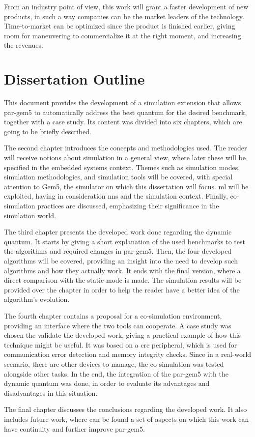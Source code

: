  From an industry point of view, this work will grant a faster development of new products, in such a way companies can be the market leaders 
 of the technology. Time-to-market can be optimized since the product is finished earlier, giving room for maneuvering to commercialize it at the 
 right moment, and increasing the revenues.
 
\section{Dissertation Outline}

This document provides the development of a simulation extension that allows par-gem5 to automatically address the best quantum for the desired 
benchmark, together with a case study. Its content was divided into six chapters, which are going to be briefly described.

The second chapter introduces the concepts and methodologies used. The reader will receive notions about simulation in a general view, where 
later these will be specified in the embedded systems context. Themes such as simulation modes, simulation methodologies, and simulation tools 
will be covered, with special attention to Gem5, the simulator on which this dissertation will focus. \gls{ml} will be exploited, having in 
consideration \glspl{nn} and the simulation context. Finally, co-simulation practices are discussed, emphasizing their significance in the 
simulation world.

The third chapter presents the developed work done regarding the dynamic quantum. It starts by giving a short explanation of the used benchmarks
to test the algorithms and required changes in par-gem5. Then, the four developed algorithms will be covered, providing an insight into the need to develop 
such algorithms and how they actually work. It ends with the final version, where a direct comparison with the static mode is made. The 
simulation results will be provided over the chapter in order to help the reader have a better idea of the algorithm's evolution.

The fourth chapter contains a proposal for a co-simulation environment, providing an interface where the two tools can cooperate. 
A case study was chosen the validate the developed work, giving a practical example of how this technique might be useful. 
It was based on a \gls{crc} peripheral, which is used for communication error detection and memory integrity checks. 
Since in a real-world scenario, there are other devices to manage, the co-simulation was tested alongside other tasks. In the end, the integration
of the par-gem5 with the dynamic quantum was done, in order to evaluate its advantages and disadvantages in this situation. 

The final chapter discusses the conclusions regarding the developed work. It also includes future work, where can be found a set of 
aspects on which this work can have continuity and further improve par-gem5. 

